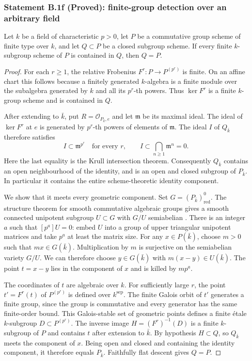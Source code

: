 \subsubsection*{Statement B.1f (Proved): finite-group detection over an arbitrary field}
Let $k$ be a field of characteristic $p>0$, let $P$ be a commutative
group scheme of finite type over $k$, and let $Q\subset P$ be a closed
subgroup scheme.  If every finite $k$-subgroup scheme of $P$ is contained
in $Q$, then $Q=P$.
\begin{proof}
For each $r\geq 1$, the relative Frobenius $F^r:P\to P^{(p^r)}$ is
finite.  On an affine chart this follows because a finitely generated
$k$-algebra is a finite module over the subalgebra generated by $k$
and all its $p^r$-th powers.  Thus $\ker F^r$ is a finite $k$-group
scheme and is contained in $Q$.

After extending to $\bar k$, put
$R=\mathcal O_{P_{\bar k},e}$ and let $\mathfrak m$ be its maximal
ideal.  The ideal of $\ker F^r$ at $e$ is generated by $p^r$-th powers
of elements of $\mathfrak m$.  The ideal $I$ of $Q_{\bar k}$ therefore
satisfies
\[
 I\subset \mathfrak m^{p^r}\quad\text{for every }r,
 \qquad I\subset\bigcap_{n\geq1}\mathfrak m^n=0.
\]
Here the last equality is the Krull intersection theorem.  Consequently
$Q_{\bar k}$ contains an open neighbourhood of the identity, and is
an open and closed subgroup of $P_{\bar k}$.  In particular it contains
the entire scheme-theoretic identity component.

We show that it meets every geometric component.  Set
$G=(P_{\bar k})_{\mathrm{red}}^0$.  The structure theorem for smooth
commutative algebraic groups gives a smooth connected unipotent subgroup
$U\subset G$ with $G/U$ semiabelian
\cite[Theorem 8.27 and Theorem 16.13]{MilneAG2022B}.
There is an integer $a$ such that $[p^a]U=0$: embed $U$ into a group
of upper triangular unipotent matrices and take $p^a$ at least the
matrix size.  For any $x\in P(\bar k)$, choose $m>0$ such that
$mx\in G(\bar k)$.  Multiplication by $m$ is surjective on the
semiabelian variety $G/U$.  We can therefore choose $y\in G(\bar k)$
with $m(x-y)\in U(\bar k)$.  The point $t=x-y$ lies in the component
of $x$ and is killed by $mp^a$.

The coordinates of $t$ are algebraic over $k$.  For sufficiently large
$r$, the point $t'=F^r(t)$ of $P^{(p^r)}$ is defined over $k^{\mathrm{sep}}$.
The finite Galois orbit of $t'$ generates a finite group, since the
group is commutative and every generator has the same finite-order
bound.  This Galois-stable set of geometric points defines a finite
\'etale $k$-subgroup $D\subset P^{(p^r)}$.  The inverse image
$H=(F^r)^{-1}(D)$ is a finite $k$-subgroup of $P$ and contains $t$
after extension to $\bar k$.  By hypothesis $H\subset Q$, so
$Q_{\bar k}$ meets the component of $x$.  Being open and closed and
containing the identity component, it therefore equals $P_{\bar k}$.
Faithfully flat descent gives $Q=P$.
\end{proof}

